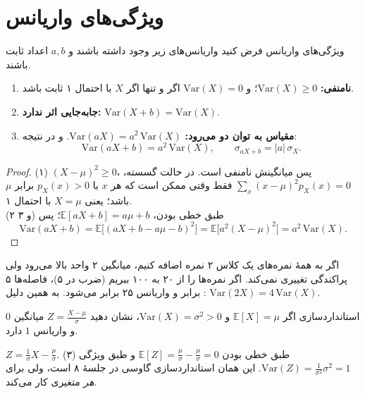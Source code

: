 \section{ویژگی‌های واریانس}
\label{sec:var-props}

\begin{theorem}[label=thm:var-props]{ویژگی‌های واریانس}
  فرض کنید واریانس‌های زیر وجود داشته باشند و $a,b$ اعداد ثابت باشند.
  \begin{enumerate}
    \item \textbf{نامنفی:} $\mathrm{Var}(X)\ge0$؛ و $\mathrm{Var}(X)=0$ اگر و تنها اگر $X$ با احتمال ۱ ثابت باشد.
    \item \textbf{جابه‌جایی اثر ندارد:} $\mathrm{Var}(X+b)=\mathrm{Var}(X)$.
    \item \textbf{مقیاس به توان دو می‌رود:} $\mathrm{Var}(aX)=a^2\,\mathrm{Var}(X)$. \newline و در نتیجه:
          \[ \mathrm{Var}(aX+b)=a^2\,\mathrm{Var}(X),\qquad \sigma_{aX+b}=|a|\,\sigma_X. \]
  \end{enumerate}
\end{theorem}

\begin{proof}
  (۱) $(X-\mu)^2\ge0$، پس میانگینش نامنفی است. در حالت گسسته، $\sum_x(x-\mu)^2p_X(x)=0$ فقط وقتی ممکن است که هر $x$ با $p_X(x)>0$ برابر $\mu$ باشد؛ یعنی $X=\mu$ با احتمال ۱.\\
  (۲ و ۳) طبق خطی بودن، $\mathbb E[aX+b]=a\mu+b$؛ پس
  \[ \mathrm{Var}(aX+b)=\mathbb E\bigl[(aX+b-a\mu-b)^2\bigr]=\mathbb E\bigl[a^2(X-\mu)^2\bigr]=a^2\,\mathrm{Var}(X). \]
\end{proof}

\begin{intuition}
  اگر به همهٔ نمره‌های یک کلاس ۲ نمره اضافه کنیم، میانگین ۲ واحد بالا می‌رود ولی پراکندگی تغییری نمی‌کند. اگر نمره‌ها را از ۲۰ به ۱۰۰ ببریم (ضرب در ۵)، فاصله‌ها ۵ برابر و واریانس ۲۵ برابر می‌شود. به همین دلیل : $\mathrm{Var}(2X)=4\,\mathrm{Var}(X)$.
\end{intuition}

\begin{example}[label=ex:standardize]{استانداردسازی}
  اگر $\mathbb E[X]=\mu$ و $\mathrm{Var}(X)=\sigma^2>0$، نشان دهید $Z=\frac{X-\mu}{\sigma}$ میانگین $0$ و واریانس $1$ دارد.
  \begin{solution}
    $Z=\frac1\sigma X-\frac\mu\sigma$. طبق خطی بودن $\mathbb E[Z]=\frac\mu\sigma-\frac\mu\sigma=0$ و طبق ویژگی (۳) $\mathrm{Var}(Z)=\frac{1}{\sigma^2}\sigma^2=1$. این همان استانداردسازی گاوسی در جلسهٔ ۸ است، ولی برای \emph{هر} متغیری کار می‌کند.
  \end{solution}
\end{example}

